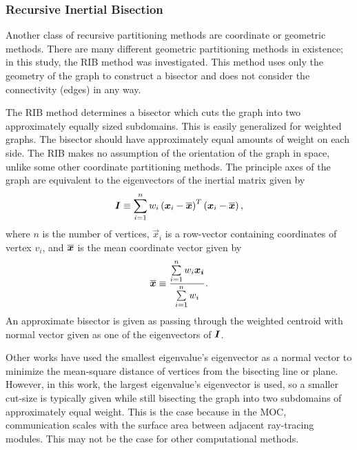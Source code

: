 {{{      \subsubsection{Recursive Inertial Bisection}{\label{sssec:Spatial Decomposition:Recursive Inertial Bisection}
        Another class of recursive partitioning methods are coordinate or geometric methods.
        There are many different geometric partitioning methods in existence; in this study, the \ac{RIB} method \cite{Elsner1997,Floros1995} was investigated.
        This method uses only the geometry of the graph to construct a bisector and does not consider the connectivity (edges) in any way.

        The \ac{RIB} method determines a bisector which cuts the graph into two approximately equally sized subdomains.
        This is easily generalized for weighted graphs.
        The bisector should have approximately equal amounts of weight on each side.
        The \ac{RIB} makes no assumption of the orientation of the graph in space, unlike some other coordinate partitioning methods.
        The principle axes of the graph are equivalent to the eigenvectors of the inertial matrix given by
        \begin{equation}
          \label{eq:Spatial Decomposition:Inertial Matrix}
          \mat{I} \defined \suml[i=1][n] w_i\left(\vec{x}_i-\avg{\vec{x}}\right)^T\left(\vec{x}_i-\avg{\vec{x}}\right),
        \end{equation}
        where $n$ is the number of vertices, $\vec{x}_i$ is a row-vector containing coordinates of vertex $v_i$, and $\overline{\boldsymbol{x}}$ is the mean coordinate vector given by
        \begin{equation}
          \label{eq:Spatial Decomposition:Mean Coordinates}
          \avg{\vec{x}} \defined \frac{\suml[i=1][n] w_i \vec{x_i}}{\suml[i=1][n] w_i}.
        \end{equation}
        An approximate bisector is given as passing through the weighted centroid with normal vector given as one of the eigenvectors of $\boldsymbol{I}$.

        Other works \cite{Elsner1997,Floros1995} have used the smallest eigenvalue's eigenvector as a normal vector to minimize the mean-square distance of vertices from the bisecting line or plane.
        However, in this work, the largest eigenvalue's eigenvector is used, so a smaller cut-size is typically given while still bisecting the graph into two subdomains of approximately equal weight.
        This is the case because in the \ac{MOC}, communication scales with the surface area between adjacent ray-tracing modules.
        This may not be the case for other computational methods.

}}}}
